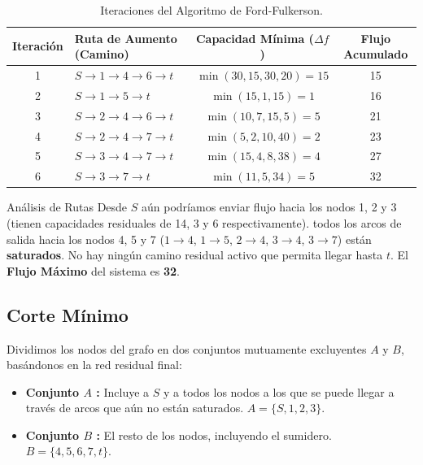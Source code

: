 \documentclass[10pt,a4paper]{article}
\begin{document}
\begin{table}[h!]
\centering
\begin{tabular}{|c|l|c|c|}
\hline
\textbf{Iteración} & \textbf{Ruta de Aumento (Camino)} & \textbf{Capacidad Mínima ($\Delta f$)} & \textbf{Flujo Acumulado} \\ \hline
1 & $S \to 1 \to 4 \to 6 \to t$ & $\min(30, 15, 30, 20) = 15$ & 15 \\ \hline
2 & $S \to 1 \to 5 \to t$       & $\min(15, 1, 15) = 1$       & 16 \\ \hline
3 & $S \to 2 \to 4 \to 6 \to t$ & $\min(10, 7, 15, 5) = 5$    & 21 \\ \hline
4 & $S \to 2 \to 4 \to 7 \to t$ & $\min(5, 2, 10, 40) = 2$    & 23 \\ \hline
5 & $S \to 3 \to 4 \to 7 \to t$ & $\min(15, 4, 8, 38) = 4$    & 27 \\ \hline
6 & $S \to 3 \to 7 \to t$       & $\min(11, 5, 34) = 5$       & 32 \\ \hline
\end{tabular}
\caption{Iteraciones del Algoritmo de Ford-Fulkerson.}
\end{table}

\begin{nota}{Análisis de Rutas}
Desde $S$ aún podríamos enviar flujo hacia los 
nodos 1, 2 y 3 (tienen capacidades residuales de 14, 3 y 6 respectivamente). 
todos los arcos de salida hacia los nodos 4, 5 y 7 
($1 \to 4$, $1 \to 5$, $2 \to 4$, $3 \to 4$, $3 \to 7$) 
están \textbf{saturados}. 
No hay ningún camino residual activo que permita llegar hasta $t$. El \textbf{Flujo Máximo} del sistema es \textbf{32}.
\end{nota}

\newpage

\subsection{Corte Mínimo}

Dividimos los nodos del grafo en dos conjuntos mutuamente excluyentes 
$A$ y $B$, basándonos en la red residual final:

\begin{itemize}
    \item \textbf{Conjunto $A$ :} Incluye a $S$ y a todos los nodos a los que se puede llegar a través de arcos que aún no están saturados. $A = \{S, 1, 2, 3\}$.
    \item \textbf{Conjunto $B$ :} El resto de los nodos, incluyendo el sumidero. $B = \{4, 5, 6, 7, t\}$.
\end{itemize}
\end{document}
